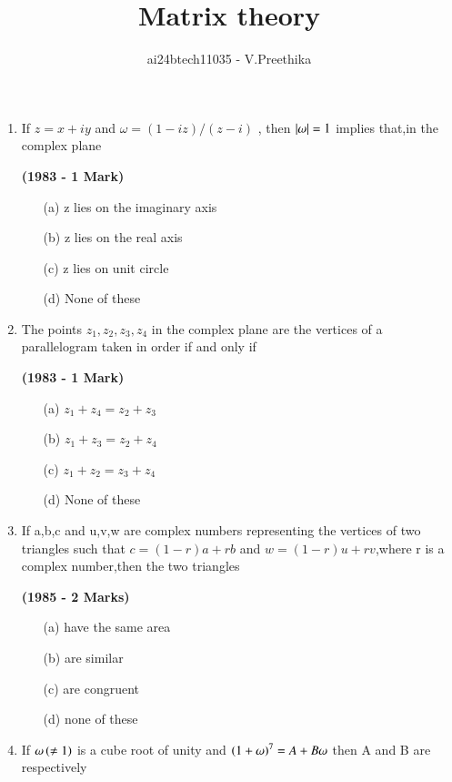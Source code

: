 \documentclass[journal,12pt,twocolumn]{IEEEtran}
\theoremstyle{remark}
\begin{document}

\vspace{3cm}

\title{Matrix theory}
\author{ai24btech11035 - V.Preethika}
\maketitle
\newpage
\bigskip

\renewcommand{\thefigure}{\theenumi}
\renewcommand{\thetable}{\theenumi}

\begin{enumerate}[start=6]
\item If $z=x+iy$ and $\omega=(1-iz)/(z-i)$ , then $\left\vert\omega\right\vert=1$ implies that,in the complex plane

\hfill{\textbf{(1983 - 1 Mark)}}

\begin{enumerate}
\item[(a)] z lies on the imaginary axis
\item[(b)] z lies on the real axis
\item[(c)] z lies on unit circle
\item[(d)] None of these
\end{enumerate}
\item The points $z_1,z_2,z_3,z_4$ in the complex plane are the vertices of a parallelogram taken in order if and only if

\hfill{\textbf{(1983 - 1 Mark)}}

\begin{enumerate}
\item[(a)] $ z_1+z_4=z_2+z_3 $
\item[(b)] $ z_1+z_3=z_2+z_4 $
\item[(c)] $ z_1+z_2=z_3+z_4 $
\item[(d)] None of these
\end{enumerate}
\item If a,b,c and u,v,w are complex numbers representing the vertices of two triangles such that $c=(1-r)a+rb$ and $w=(1-r)u+rv$,where r is a complex number,then the two triangles

\hfill{\textbf{(1985 - 2 Marks)}}

\begin{enumerate}
\item[(a)] have the same area
\item[(b)] are similar
\item[(c)] are congruent
\item[(d)] none of these
\end{enumerate}
\item If $\omega\left(\neq1\right)$ is a cube root of unity and $\left(1+\omega\right)^7=A+B\omega$ then A and B are respectively


\end{enumerate}
\end{document}
